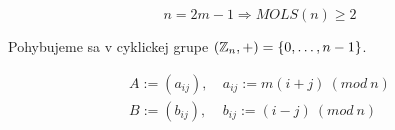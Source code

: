 \begin{theorem}
$$n = 2m - 1 \Rightarrow MOLS(n) \geq 2$$
\end{theorem}

\begin{construction}

Pohybujeme sa v cyklickej grupe $(\mathbb{Z}_n, +) = \left\{0, \ldots, n-1\right\}$.

\begin{align*}
A := (a_{ij}),~& a_{ij} := m (i+j)~(mod~n) \\
B := (b_{ij}),~& b_{ij} := (i-j)  ~(mod~n)    
\end{align*}
\end{construction}
